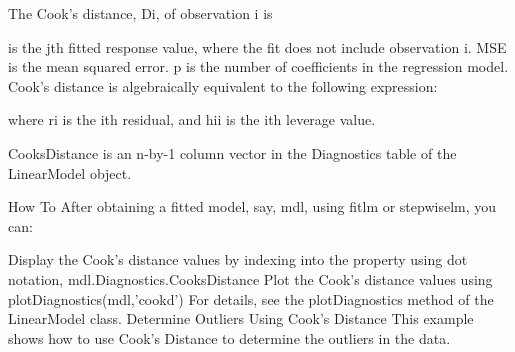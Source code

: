 \documentclass[residuals.tex]{subfiles}
\begin{document}
\newpage
The Cook's distance, Di, of observation i is


 is the jth fitted response value, where the fit does not include observation i.
MSE is the mean squared error.
p is the number of coefficients in the regression model.
Cook's distance is algebraically equivalent to the following expression:


where ri is the ith residual, and hii is the ith leverage value.

CooksDistance is an n-by-1 column vector in the Diagnostics table of the LinearModel object.

How To
After obtaining a fitted model, say, mdl, using fitlm or stepwiselm, you can:

Display the Cook's distance values by indexing into the property using dot notation,
mdl.Diagnostics.CooksDistance
Plot the Cook's distance values using
plotDiagnostics(mdl,'cookd')
For details, see the plotDiagnostics method of the LinearModel class.
Determine Outliers Using Cook's Distance
This example shows how to use Cook's Distance to determine the outliers in the data.
\end{document}
